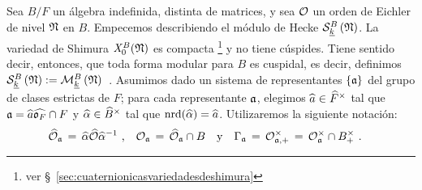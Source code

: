 Sea $B/F$ un \'{a}lgebra indefinida, distinta de matrices, y sea $\cal{O}$ un
orden de Eichler de nivel $\frak{N}$ en $B$. Empecemos describiendo el
m\'{o}dulo de Hecke $\spitzH[B]{k}{\frak{N}}$. La variedad de Shimura
$\shimura[B]{\frak{N}}$ es compacta%
\footnote{
	ver \S~\ref{sec:cuaternionicasvariedadesdeshimura}
}
y no tiene c\'{u}spides. Tiene sentido decir, entonces, que toda forma modular
para $B$ es cuspidal, es decir, definimos
\begin{math}
	\spitzH[B]{k}{\frak{N}}:=\modularH[B]{k}{\frak{N}}
\end{math}~.
Asumimos dado un sistema de representantes $\{\frak{a}\}$ del grupo de clases
estrictas de $F$; para cada representante $\frak{a}$, elegimos
$\hhat{a}\in\Idfin{F}$ tal que $\frak{a}=\hhat{a}\Adfin{\oka{F}}\cap F$ y
$\hhat{\alpha}\in\Idfin{B}$ tal que $\nrd(\hhat{\alpha})=\hhat{a}$.
Utilizaremos la siguiente notaci\'{o}n:
\begin{align*}
	\Adfin{\cal{O}}_{\frak{a}} \,=\,
		\hhat{\alpha}\Adfin{\cal{O}}\hhat{\alpha}^{-1} & \text{ ,}\quad
		\cal{O}_{\frak{a}}\,=\,\Adfin{\cal{O}}_{\frak{a}}\cap B
			\quad\text{y}\quad
		\Gamma_{\frak{a}}\,=\,\cal{O}_{\frak{a},+}^{\times}\,=\,
			\cal{O}_{\frak{a}}^{\times}\cap B_{+}^{\times}
	\text{ .}
\end{align*}
%

